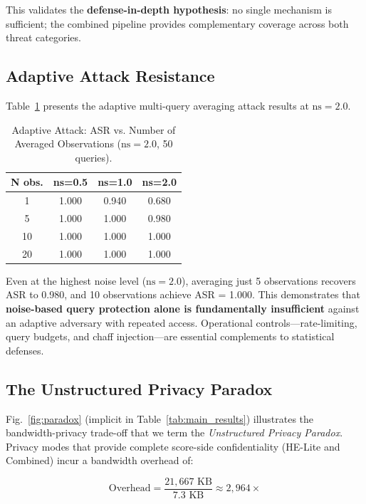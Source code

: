 \documentclass[conference]{IEEEtran}
\begin{document}
This validates the \textbf{defense-in-depth hypothesis}: no single mechanism is sufficient; the combined pipeline provides complementary coverage across both threat categories.

\subsection{Adaptive Attack Resistance}

Table~\ref{tab:adaptive} presents the adaptive multi-query averaging attack results at $\text{ns}=2.0$.

\begin{table}[t]
\centering
\caption{Adaptive Attack: ASR vs. Number of Averaged Observations ($\text{ns}=2.0$, 50 queries).}
\label{tab:adaptive}
\begin{tabular}{@{}cccc@{}}
\toprule
\textbf{N obs.} & \textbf{ns=0.5} & \textbf{ns=1.0} & \textbf{ns=2.0} \\
\midrule
1 & 1.000 & 0.940 & 0.680 \\
5 & 1.000 & 1.000 & 0.980 \\
10 & 1.000 & 1.000 & 1.000 \\
20 & 1.000 & 1.000 & 1.000 \\
\bottomrule
\end{tabular}
\end{table}

Even at the highest noise level ($\text{ns}=2.0$), averaging just 5 observations recovers ASR to 0.980, and 10 observations achieve ASR = 1.000. This demonstrates that \textbf{noise-based query protection alone is fundamentally insufficient} against an adaptive adversary with repeated access. Operational controls---rate-limiting, query budgets, and chaff injection---are essential complements to statistical defenses.

\subsection{The Unstructured Privacy Paradox}

Fig.~\ref{fig:paradox} (implicit in Table~\ref{tab:main_results}) illustrates the bandwidth-privacy trade-off that we term the \textit{Unstructured Privacy Paradox}. Privacy modes that provide complete score-side confidentiality (HE-Lite and Combined) incur a bandwidth overhead of:

\begin{equation}
    \text{Overhead} = \frac{21{,}667 \text{ KB}}{7.3 \text{ KB}} \approx 2{,}964\times
\end{equation}
\end{document}
